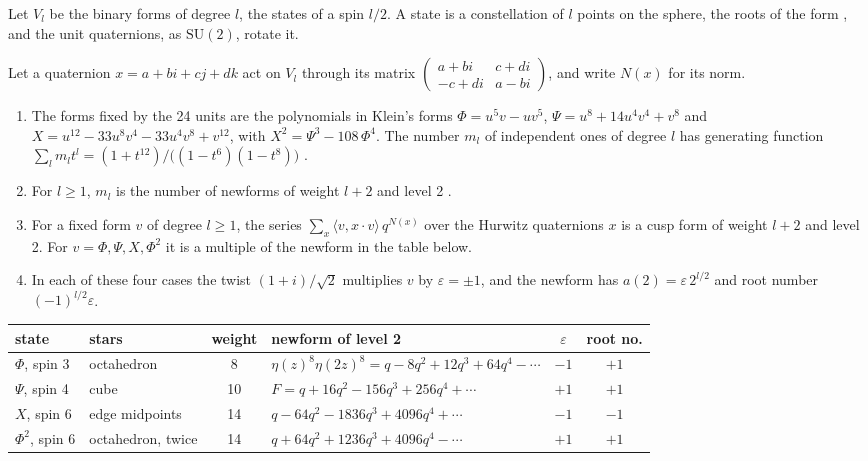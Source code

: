 \documentclass[11pt]{article}
\begin{document}
Let $V_l$ be the binary forms of degree $l$, the states of a spin $l/2$.
A state is a constellation of $l$ points on the sphere, the roots of the form \cite{Majorana}, and the unit quaternions, as $\mathrm{SU}(2)$, rotate it.

\begin{derivation}\label{d:hurwitz}
Let a quaternion $x = a+bi+cj+dk$ act on $V_l$ through its matrix $\left(\begin{smallmatrix}a+bi&c+di\\-c+di&a-bi\end{smallmatrix}\right)$, and write $N(x)$ for its norm.
\begin{enumerate}[label=(\roman*)]
\item The forms fixed by the 24 units are the polynomials in Klein's forms
$\Phi = u^5v-uv^5$, $\Psi = u^8+14u^4v^4+v^8$ and $X = u^{12}-33u^8v^4-33u^4v^8+v^{12}$, with $X^2 = \Psi^3-108\,\Phi^4$.
The number $m_l$ of independent ones of degree $l$ has generating function $\sum_l m_lt^l = (1+t^{12})/\big((1-t^6)(1-t^8)\big)$ \cite{Klein}.
\item For $l\ge1$, $m_l$ is the number of newforms of weight $l+2$ and level 2 \cite{Eichler, JacquetLanglands}.
\item For a fixed form $v$ of degree $l\ge1$, the series $\sum_x\langle v,x\cdot v\rangle\,q^{N(x)}$ over the Hurwitz quaternions $x$ is a cusp form of weight $l+2$ and level 2.
For $v = \Phi,\Psi,X,\Phi^2$ it is a multiple of the newform in the table below.
\item In each of these four cases the twist $(1+i)/\sqrt2$ multiplies $v$ by $\varepsilon = \pm1$, and the newform has $a(2) = \varepsilon\,2^{l/2}$ and root number $(-1)^{l/2}\varepsilon$.
\end{enumerate}
\end{derivation}

\begin{center}
\small
\begin{tabular}{@{}llclcc@{}}
\toprule
state & stars & weight & newform of level 2 & $\varepsilon$ & root no.\\
\midrule
$\Phi$, spin 3 & octahedron & 8 & $\eta(z)^8\eta(2z)^8 = q-8q^2+12q^3+64q^4-\cdots$ & $-1$ & $+1$\\
$\Psi$, spin 4 & cube & 10 & $F = q+16q^2-156q^3+256q^4+\cdots$ & $+1$ & $+1$\\
$X$, spin 6 & edge midpoints & 14 & $q-64q^2-1836q^3+4096q^4+\cdots$ & $-1$ & $-1$\\
$\Phi^2$, spin 6 & octahedron, twice & 14 & $q+64q^2+1236q^3+4096q^4-\cdots$ & $+1$ & $+1$\\
\bottomrule
\end{tabular}
\end{center}
\end{document}
